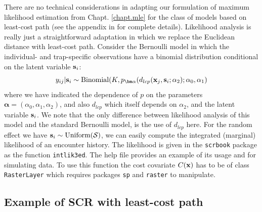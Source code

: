 There are no technical considerations in adapting our formulation of
maximum likelihood estimation \citep{borchers_efford:2008} from
Chapt. \ref{chapt.mle} for the class of models based on least-cost
path (see the appendix in \citet{royle_etal:2012ecol} for complete details).
Likelihood analysis is really just a straightforward adaptation in which we
replace the Euclidean distance with least-cost path.  Consider the
Bernoulli model in which the individual- and trap-specific
observations have a binomial distribution conditional on the latent
variable ${\bf s}_{i}$:
\begin{equation}
  y_{ij}| {\bf s}_{i} \sim \mbox{Binomial}(K, p_{\bm \alpha}(d_{lcp}({\bf x}_{j},{\bf s}_{i};\alpha_{2}); \alpha_{0}, \alpha_{1})
\label{ecoldist.eq.cond-on-s}
\end{equation}
where we have indicated the dependence of $p$ on the parameters
${\bm \alpha} =(\alpha_{0},\alpha_{1},\alpha_{2})$, and also $d_{lcp}$ which
itself depends on $\alpha_{2}$, and the latent variable ${\bf s}_i$.
We note that the only difference between likelihood analysis of this
model and the standard Bernoulli model, is the use of $d_{lcp}$ here.
For the random effect we have ${\bf s}_{i} \sim  \mbox{Uniform}({\cal
  S})$, we can easily compute the integrated (marginal) likelihood of
an encounter history.
The likelihood is given in the {\tt scrbook} package as the function
\mbox{\tt intlik3ed}. The help file
provides an example of its usage and for simulating data.
To use this function the cost covariate $C({\bf x})$ has to be of class
\mbox{\tt RasterLayer} which requires packages \mbox{\tt sp} and
\mbox{\tt raster} to manipulate.


\subsection{Example of SCR with least-cost path}

